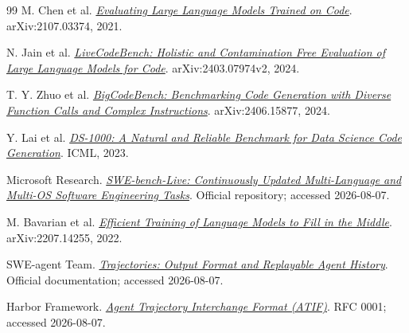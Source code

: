\documentclass[10pt,a4paper,UTF8,fontset=none]{ctexart}
\def\BilingualTocExtension{entoc}
\newcommand{\BilingualUseChineseToc}{\gdef\BilingualTocExtension{zhtoc}}
\def\BilingualAnchorPrefix{en}
\begin{document}
\begin{thebibliography}{99}
M. Chen et al. \href{https://arxiv.org/abs/2107.03374}{\textit{Evaluating Large Language Models Trained on Code}}. arXiv:2107.03374, 2021.

N. Jain et al. \href{https://arxiv.org/abs/2403.07974}{\textit{LiveCodeBench: Holistic and Contamination Free Evaluation of Large Language Models for Code}}. arXiv:2403.07974v2, 2024.

T. Y. Zhuo et al. \href{https://arxiv.org/abs/2406.15877}{\textit{BigCodeBench: Benchmarking Code Generation with Diverse Function Calls and Complex Instructions}}. arXiv:2406.15877, 2024.

Y. Lai et al. \href{https://arxiv.org/abs/2211.11501}{\textit{DS-1000: A Natural and Reliable Benchmark for Data Science Code Generation}}. ICML, 2023.

Microsoft Research. \href{https://github.com/microsoft/SWE-bench-Live}{\textit{SWE-bench-Live: Continuously Updated Multi-Language and Multi-OS Software Engineering Tasks}}. Official repository; accessed 2026-08-07.

M. Bavarian et al. \href{https://arxiv.org/abs/2207.14255}{\textit{Efficient Training of Language Models to Fill in the Middle}}. arXiv:2207.14255, 2022.

SWE-agent Team. \href{https://github.com/SWE-agent/SWE-agent/blob/main/docs/usage/trajectories.md}{\textit{Trajectories: Output Format and Replayable Agent History}}. Official documentation; accessed 2026-08-07.

Harbor Framework. \href{https://github.com/harbor-framework/harbor/blob/main/rfcs/0001-trajectory-format.md}{\textit{Agent Trajectory Interchange Format (ATIF)}}. RFC 0001; accessed 2026-08-07.

\end{thebibliography}
\clearpage
{}
\setcounter{section}{0}
\setcounter{subsection}{0}
\setcounter{subsubsection}{0}
\setcounter{equation}{0}
\setcounter{figure}{0}
\setcounter{table}{0}
\setcounter{footnote}{0}
\setcounter{tocdepth}{2}
\renewcommand{\contentsname}{目录}
\renewcommand{\figurename}{图}
\renewcommand{\tablename}{表}
\renewcommand{\refname}{参考文献}
\renewcommand{\appendixname}{附录}
\BilingualUseChineseToc
{}
\renewcommand*{\theHsection}{zh.\arabic{section}}
\renewcommand*{\theHsubsection}{zh.\arabic{section}.\arabic{subsection}}
\renewcommand*{\theHsubsubsection}{zh.\arabic{section}.\arabic{subsection}.\arabic{subsubsection}}
\renewcommand*{\theHequation}{zh.\arabic{equation}}
\renewcommand*{\theHfigure}{zh.\arabic{figure}}
\renewcommand*{\theHtable}{zh.\arabic{table}}
\gdef\BilingualAnchorPrefix{zh}
\markboth{}{}
\markboth{}{}
\end{document}
